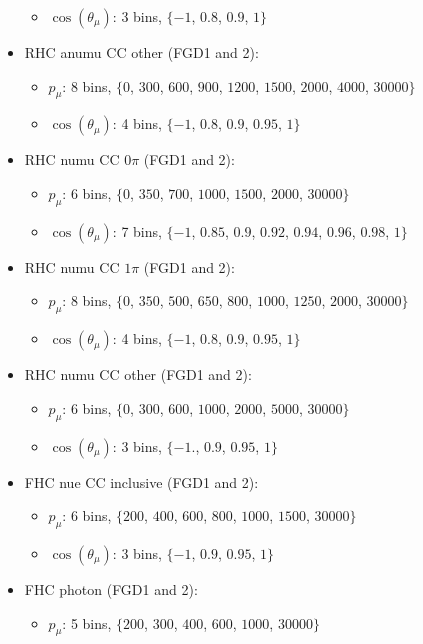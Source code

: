 \begin{itemize}
\begin{itemize}
  \item $\cos(\theta_\mu)$: 3 bins, $\{-1$, $0.8$, $0.9$, $1\}$
  \end{itemize} 
\item \Gls{RHC} \Gls{anumu} \Gls{CC} other (\Gls{FGD}1 and 2):
  \begin{itemize}
  \item $p_\mu$: 8 bins, $\{0$, $300$, $600$, $900$, $1200$, $1500$, $2000$, $4000$, $30000\}$
  \item $\cos(\theta_\mu)$: 4 bins, $\{-1$, $0.8$, $0.9$, $0.95$, $1\}$
  \end{itemize}
\item \Gls{RHC} \Gls{numu} \Gls{CC} $0\pi$ (\Gls{FGD}1 and 2):
  \begin{itemize}
  \item $p_\mu$: 6 bins, $\{0$, $350$, $700$, $1000$, $1500$, $2000$, $30000\}$
  \item $\cos(\theta_\mu)$: 7 bins, $\{-1$, $0.85$, $0.9$, $0.92$, $0.94$, $0.96$, $0.98$, $1\}$
  \end{itemize}
\item \Gls{RHC} \Gls{numu} \Gls{CC} $1\pi$ (\Gls{FGD}1 and 2):
  \begin{itemize}
  \item $p_\mu$: 8 bins, $\{0$, $350$, $500$, $650$, $800$, $1000$, $1250$, $2000$, $30000\}$
  \item $\cos(\theta_\mu)$: 4 bins, $\{-1$, $0.8$, $0.9$, $0.95$, $1\}$
  \end{itemize} 
\item \Gls{RHC} \Gls{numu} \Gls{CC} other (\Gls{FGD}1 and 2):
  \begin{itemize}
  \item $p_\mu$: 6 bins, $\{0$, $300$, $600$, $1000$, $2000$, $5000$, $30000\}$
  \item $\cos(\theta_\mu)$: 3 bins, $\{-1.$, $0.9$, $0.95$, $1\}$
  \end{itemize}
\item \Gls{FHC} \Gls{nue} \Gls{CC} inclusive (\Gls{FGD}1 and 2):
  \begin{itemize}
  \item $p_\mu$: 6 bins, $\{200$, $400$, $600$, $800$, $1000$, $1500$, $30000\}$
  \item $\cos(\theta_\mu)$: 3 bins, $\{-1$, $0.9$, $0.95$, $1\}$
  \end{itemize}
\item \Gls{FHC} photon (\Gls{FGD}1 and 2):
  \begin{itemize}
  \item $p_\mu$: 5 bins, $\{200$, $300$, $400$, $600$, $1000$, $30000\}$

\end{itemize}
\end{itemize}
